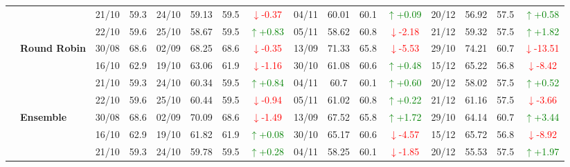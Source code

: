{\begin{longtable}{llcc|cccc|cccc|cccc}
&
& 21/10 & 59.3 & 24/10 & 59.13 & 59.5 & \textcolor{red}{\(\downarrow\)-0.37} & 04/11 & 60.01 & 60.1 & \textcolor{green}{\(\uparrow\)+0.09} & 20/12 & 56.92 & 57.5 & \textcolor{green}{\(\uparrow\)+0.58} \\

&
& 22/10 & 59.6 & 25/10 & 58.67 & 59.5 & \textcolor{green}{\(\uparrow\)+0.83} & 05/11 & 58.62 & 60.8 & \textcolor{red}{\(\downarrow\)-2.18} & 21/12 & 59.32 & 57.5 & \textcolor{green}{\(\uparrow\)+1.82} \\
\cmidrule(lr){2-16}


& \textbf{Round Robin}
& 30/08 & 68.6 & 02/09 & 68.25 & 68.6 & \textcolor{red}{\(\downarrow\)-0.35} & 13/09 & 71.33 & 65.8 & \textcolor{red}{\(\downarrow\)-5.53} & 29/10 & 74.21 & 60.7 & \textcolor{red}{\(\downarrow\)-13.51} \\

&
& 16/10 & 62.9 & 19/10 & 63.06 & 61.9 & \textcolor{red}{\(\downarrow\)-1.16} & 30/10 & 61.08 & 60.6 & \textcolor{green}{\(\uparrow\)+0.48} & 15/12 & 65.22 & 56.8 & \textcolor{red}{\(\downarrow\)-8.42} \\

&
& 21/10 & 59.3 & 24/10 & 60.34 & 59.5 & \textcolor{green}{\(\uparrow\)+0.84} & 04/11 & 60.7 & 60.1 & \textcolor{green}{\(\uparrow\)+0.60} & 20/12 & 58.02 & 57.5 & \textcolor{green}{\(\uparrow\)+0.52} \\

&
& 22/10 & 59.6 & 25/10 & 60.44 & 59.5 & \textcolor{red}{\(\downarrow\)-0.94} & 05/11 & 61.02 & 60.8 & \textcolor{green}{\(\uparrow\)+0.22} & 21/12 & 61.16 & 57.5 & \textcolor{red}{\(\downarrow\)-3.66} \\
\cmidrule(lr){2-16}

& \textbf{Ensemble}
& 30/08 & 68.6 & 02/09 & 70.09 & 68.6 & \textcolor{red}{\(\downarrow\)-1.49} & 13/09 & 67.52 & 65.8 & \textcolor{green}{\(\uparrow\)+1.72} & 29/10 & 64.14 & 60.7 & \textcolor{green}{\(\uparrow\)+3.44} \\

&
& 16/10 & 62.9 & 19/10 & 61.82 & 61.9 & \textcolor{green}{\(\uparrow\)+0.08} & 30/10 & 65.17 & 60.6 & \textcolor{red}{\(\downarrow\)-4.57} & 15/12 & 65.72 & 56.8 & \textcolor{red}{\(\downarrow\)-8.92} \\

&
& 21/10 & 59.3 & 24/10 & 59.78 & 59.5 & \textcolor{green}{\(\uparrow\)+0.28} & 04/11 & 58.25 & 60.1 & \textcolor{red}{\(\downarrow\)-1.85} & 20/12 & 55.53 & 57.5 & \textcolor{green}{\(\uparrow\)+1.97} \\


\end{longtable}}
